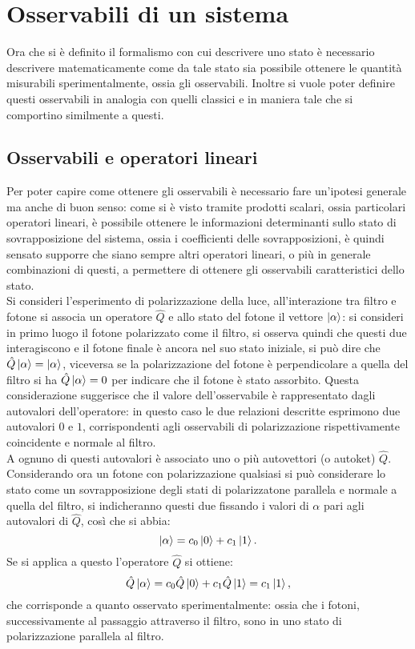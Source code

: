 \section{Osservabili di un sistema}
Ora che si è definito il formalismo con cui descrivere uno stato è necessario descrivere matematicamente come da tale stato sia possibile ottenere le quantità misurabili sperimentalmente, ossia gli osservabili. Inoltre si vuole poter definire questi osservabili in analogia con quelli classici e in maniera tale che si comportino similmente a questi.
\subsection{Osservabili e operatori lineari}
Per poter capire come ottenere gli osservabili è necessario fare un'ipotesi generale ma anche di buon senso: come si è visto tramite prodotti scalari, ossia particolari operatori lineari, è possibile ottenere le informazioni determinanti sullo stato di sovrapposizione del sistema, ossia i coefficienti delle sovrapposizioni, è quindi sensato supporre che siano sempre altri operatori lineari, o più in generale combinazioni di questi, a permettere di ottenere gli osservabili caratteristici dello stato.\\ 

Si consideri l'esperimento di polarizzazione della luce, all'interazione tra filtro e fotone si associa un operatore $\hat Q$ e allo stato del fotone il vettore $\ket{\alpha}$: si consideri in primo luogo il fotone polarizzato come il filtro, si osserva quindi che questi due interagiscono e il fotone finale è ancora nel suo stato iniziale, si può dire che $\hat Q\ket{\alpha}=\ket\alpha$, viceversa se la polarizzazione del fotone è perpendicolare a quella del filtro si ha $\hat Q\ket{\alpha}=0$ per indicare che il fotone è stato assorbito. Questa considerazione suggerisce che il valore dell'osservabile è rappresentato dagli autovalori dell'operatore: in questo caso le due relazioni descritte esprimono due autovalori $0$ e $1$, corrispondenti agli osservabili di polarizzazione rispettivamente coincidente e normale al filtro.\\ A ognuno di questi autovalori è associato uno o più autovettori (o autoket) $\hat Q$.\\
Considerando ora un fotone con polarizzazione qualsiasi si può considerare lo stato come un sovrapposizione degli stati di polarizzatone parallela e normale a quella del filtro, si indicheranno questi due fissando i valori di $\alpha$ pari agli autovalori di $\hat Q$, così che si abbia:
\begin{equation*}
    \ket{\alpha}=c_0\ket{0}+c_1\ket{1}.
\end{equation*}
Se si applica a questo l'operatore $\hat Q$ si ottiene:
\begin{equation*}
    \hat Q\ket{\alpha}=c_0\hat Q\ket{0}+c_1\hat Q\ket{1}=c_1\ket{1},
\end{equation*}
che corrisponde a quanto osservato sperimentalmente: ossia che i fotoni, successivamente al passaggio attraverso il filtro, sono in uno stato di polarizzazione parallela al filtro.
